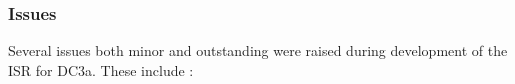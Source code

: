 \iffalse
%
%
\subsubsection{Results}

The only truly testable portion of the ISR during DC3a was the
identification and masking of the cosmic rays synthesized for the
second (i.e. exposure idenifier 1) images.  

\fi

\subsubsection{Issues}

Several issues both minor and outstanding were raised during
development of the ISR for DC3a.  These include :

